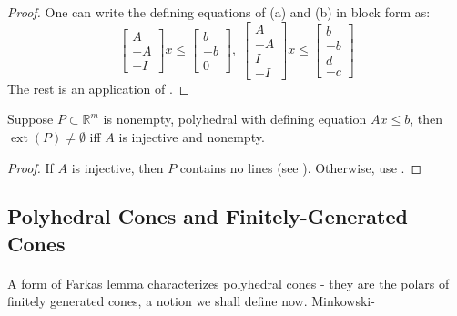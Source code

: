\begin{proof}
	One can write the defining equations of (a) and (b) in block form as:
	\[
		\left[
			\begin{array}{r}
				A  \\\hline
				-A \\\hline
				-I
			\end{array}
			\right]
		x\leq
		\left[
			\begin{array}{r}
				b  \\\hline
				-b \\\hline
				0
			\end{array}
			\right],\;
		\left[
			\begin{array}{r}
				A  \\\hline
				-A \\\hline
				I  \\\hline
				-I
			\end{array}
			\right]
		x\leq
		\left[
			\begin{array}{r}
				b  \\\hline
				-b \\\hline
				d  \\\hline
				-c
			\end{array}
			\right]
	\]
	The rest is an application of .
\end{proof}

\begin{coro}\label{coro:017-extreme-existence-poly}
	Suppose $P\subset \mathbb{R}^m$ is nonempty, polyhedral with defining equation $Ax\leq b$, then $\operatorname{ext}(P)\neq\emptyset$ iff $A$ is injective and nonempty.
\end{coro}
\begin{proof}
	If $A$ is injective, then $P$ contains no lines (see ). Otherwise, use .
\end{proof}

\subsection{Polyhedral Cones and Finitely-Generated Cones}

\paragraph{}A form of Farkas lemma characterizes polyhedral cones - they are the polars of finitely generated cones, a notion we shall define now. Minkowski-

